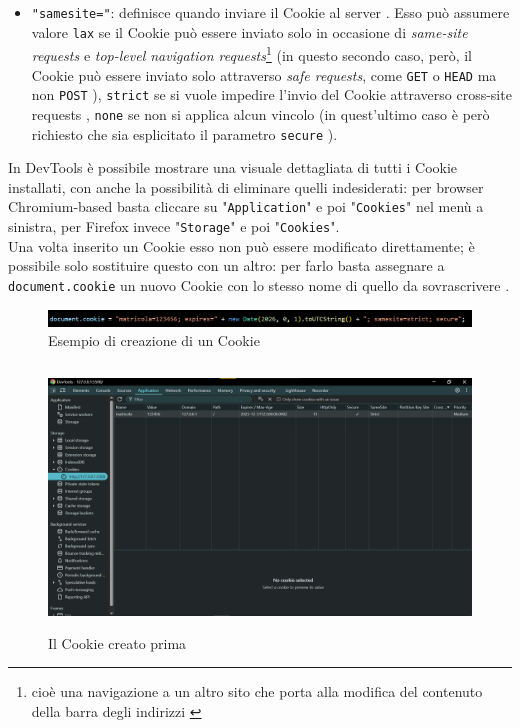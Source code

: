 \documentclass[a4paper, 12pt, twoside, openright]{book}
\begin{document}
\begin{itemize}
\item\texttt{"samesite="}: definisce quando inviare il Cookie al server \cite{MDN_Web_docs:cookies}. Esso può assumere valore \texttt{lax} se il Cookie può essere inviato solo in occasione di \textit{same-site requests} e \textit{top-level navigation requests}\footnote{cioè una navigazione a un altro sito che porta alla modifica del contenuto della barra degli indirizzi \cite{Stack_overflow:samesite}} \cite{MDN_Web_docs:cookies} (in questo secondo caso, però, il Cookie può essere inviato solo attraverso \textit{safe requests}, come \texttt{GET} o \texttt{HEAD} ma non \texttt{POST} \cite{Stack_overflow:samesite}), \texttt{strict} se si vuole impedire l'invio del Cookie attraverso cross-site requests \cite{MDN_Web_docs:cookies}, \texttt{none} se non si applica alcun vincolo \cite{MDN_Web_docs:cookies} (in quest'ultimo caso è però richiesto che sia esplicitato il parametro \texttt{secure} \cite{MDN_Web_docs:HTTP_cookies}).
\end{itemize}
In DevTools è possibile mostrare una visuale dettagliata di tutti i Cookie installati, con anche la possibilità di eliminare quelli indesiderati: per browser Chromium-based basta cliccare su "\texttt{Application}" e poi "\texttt{Cookies}" nel menù a sinistra, per Firefox invece "\texttt{Storage}" e poi "\texttt{Cookies}".\\
Una volta inserito un Cookie esso non può essere modificato direttamente; è possibile solo sostituire questo con un altro: per farlo basta assegnare a \texttt{document.cookie} un nuovo Cookie con lo stesso nome di quello da sovrascrivere \cite{W3Schools:cookies}.\\
\begin{figure}[ht]
  \centering
  \includegraphics[width=15cm]{images/cookies/code_snippet.png}
  \caption{Esempio di creazione di un Cookie}
  \label{example_cookie:code_snippet}
\end{figure}
\begin{figure}[ht]
  \centering
  \includegraphics[height=7cm]{images/cookies/demonstration.png}
  \caption{Il Cookie creato prima}
  \label{example_cookie}
\end{figure}
\end{document}
